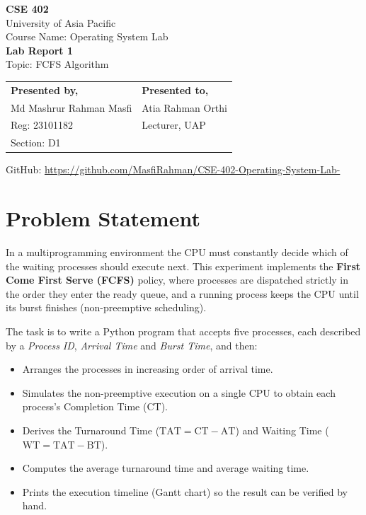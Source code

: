 \documentclass[12pt,a4paper]{article}
\begin{document}
\begin{titlepage}
  \centering
  \vspace*{1.5cm}
  {\Large\bfseries CSE 402}\\[4pt]
  {\large University of Asia Pacific}\\[6pt]
  {\large Course Name: Operating System Lab}\\[12pt]
  {\LARGE\bfseries Lab Report 1}\\[8pt]
  {\Large Topic: FCFS Algorithm}\\[2cm]

  \begin{tabular}{@{}p{6cm}p{6cm}@{}}
    \textbf{Presented by,} & \textbf{Presented to,}\\[4pt]
    Md Mashrur Rahman Masfi & Atia Rahman Orthi\\
    Reg: 23101182 & Lecturer, UAP\\
    Section: D1 & \\
  \end{tabular}

  \vfill
  {\small GitHub: \url{https://github.com/MasfiRahman/CSE-402-Operating-System-Lab-}}
\end{titlepage}

\section{Problem Statement}

In a multiprogramming environment the CPU must constantly decide which of the
waiting processes should execute next. This experiment implements the
\textbf{First Come First Serve (FCFS)} policy, where processes are dispatched
strictly in the order they enter the ready queue, and a running process keeps
the CPU until its burst finishes (non-preemptive scheduling).

The task is to write a Python program that accepts five processes, each
described by a \textit{Process ID}, \textit{Arrival Time} and
\textit{Burst Time}, and then:

\begin{itemize}[leftmargin=*]
  \item Arranges the processes in increasing order of arrival time.
  \item Simulates the non-preemptive execution on a single CPU to obtain each
        process's Completion Time (CT).
  \item Derives the Turnaround Time ($\text{TAT} = \text{CT} - \text{AT}$)
        and Waiting Time ($\text{WT} = \text{TAT} - \text{BT}$).
  \item Computes the average turnaround time and average waiting time.
  \item Prints the execution timeline (Gantt chart) so the result can be
        verified by hand.
\end{itemize}
\end{document}
